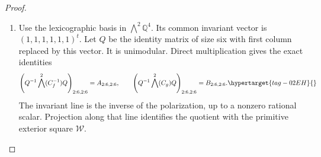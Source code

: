 \documentclass[11pt,a4paper]{article}
\numberwithin{equation}{section}
\theoremstyle{definition}
\begin{document}
\begin{proof}
\begin{enumerate}[label=\arabic*.]
\begin{equation}
\begin{pmatrix}
 \end{pmatrix}.
 \hypertarget{tag-02EG}{}\label{maps:eq:F.10}
\end{equation}
Their difference has rank one and their characteristic polynomials
are $f,g$.  More explicitly, put
\[
 \begin{aligned}
 \mathsf B&=(u,Ru,R^2u,R^3u),\\
 d&=(C_f-C_g)e_4=(0,-1,-1,-1)^t,\\
 \mathsf B_c&=(d,C_fd,C_f^2d,C_f^3d).
 \end{aligned}
\]
Here $\det\mathsf B_c=1$.  Uniqueness of the covector in
\eqref{maps:eq:F.9} gives the intertwiner
$\mathsf P=\mathsf B\mathsf B_c^{-1}$, with
$R\mathsf P=\mathsf P C_f$ and $S\mathsf P=\mathsf P C_g$.
Thus $(T_1,T_2)$ is rationally conjugate to
$(C_f^{-1},C_g)$, with the chosen peripheral conventions.

\item Use the lexicographic basis in $\bigwedge^2\mathbb Q^4$.
Its common invariant vector is $(1,1,1,1,1,1)^t$.
Let $Q$ be the identity matrix of size six with first column
replaced by this vector.  It is unimodular.  Direct multiplication
gives the exact identities
\begin{equation}
 \left(Q^{-1}\bigwedge^2(C_f^{-1})Q\right)_{2:6,2:6}
   =A_{2:6,2:6},\qquad
 \left(Q^{-1}\bigwedge^2(C_g)Q\right)_{2:6,2:6}
   =B_{2:6,2:6}.
 \hypertarget{tag-02EH}{}\label{maps:eq:F.11}
\end{equation}
The invariant line is the inverse of the polarization, up to a
nonzero rational scalar.  Projection along that line identifies
the quotient with the primitive exterior square $\mathcal W$.


\end{enumerate}
\end{proof}
\end{document}
